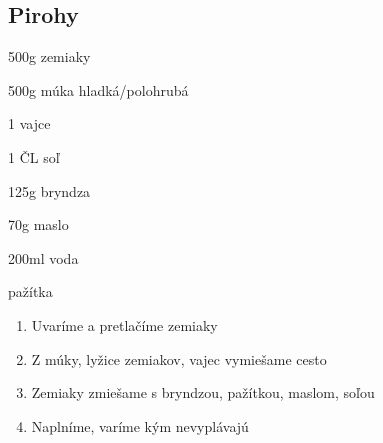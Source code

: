 \setcounter{step}{0}
\subsection{Pirohy}

\begin{ingredient}
\def\portions{4}%

\begin{main}
	\item 500g zemiaky
	\item 500g múka hladká/polohrubá
	\item 1 vajce
	\item 1 ČL soľ
	\item 125g bryndza
	\item 70g maslo
	\item 200ml voda
	\item pažítka
\end{main}
\end{ingredient}
\begin{recipe}

\begin{enumerate}

\item{Uvaríme a pretlačíme zemiaky}
\item{Z múky, lyžice zemiakov, vajec vymiešame cesto}
\item{Zemiaky zmiešame s bryndzou, pažítkou, maslom, soľou}	
\item{Naplníme, varíme kým nevyplávajú}

\end{enumerate}
\end{recipe}

\begin{notes}

\end{notes}
\clearpage	